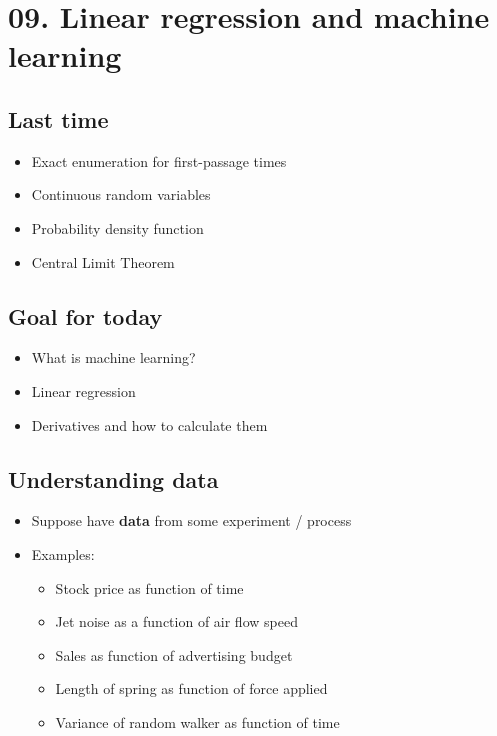 \hypertarget{linear-regression-and-machine-learning}{%
\section{09. Linear regression and machine
learning}\label{linear-regression-and-machine-learning}}

\hypertarget{last-time}{%
\subsection{Last time}\label{last-time}}

\begin{itemize}
\item
  Exact enumeration for first-passage times
\item
  Continuous random variables
\item
  Probability density function
\item
  Central Limit Theorem
\end{itemize}

\hypertarget{goal-for-today}{%
\subsection{Goal for today}\label{goal-for-today}}

\begin{itemize}
\item
  What is machine learning?
\item
  Linear regression
\item
  Derivatives and how to calculate them
\end{itemize}

\hypertarget{understanding-data}{%
\subsection{Understanding data}\label{understanding-data}}

\begin{itemize}
\item
  Suppose have \textbf{data} from some experiment / process
\item
  Examples:

  \begin{itemize}
  \item
    Stock price as function of time
  \item
    Jet noise as a function of air flow speed
  \item
    Sales as function of advertising budget
  \item
    Length of spring as function of force applied
  \item
    Variance of random walker as function of time
  \end{itemize}
\end{itemize}

